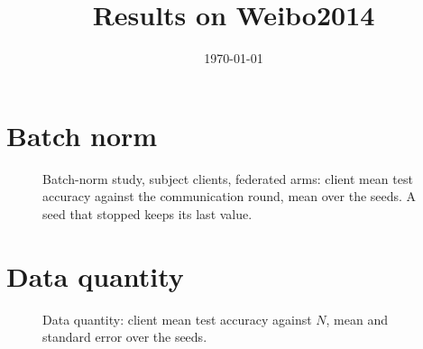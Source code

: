 \documentclass[a4paper]{article}
\title{Results on Weibo2014}
\date{\today}
\begin{document}
\maketitle
\section{Batch norm}
\begin{table}[htbp]\centering
\caption{Batch-norm study: client mean test accuracy (\%), mean $\pm$ std over the seeds. Best mean of each row and network in bold.}
\resizebox{\ifdim\width>\linewidth\linewidth\else\width\fi}{!}{}
\end{table}
\begin{table}[htbp]\centering
\caption{Batch-norm study, SPDNet, subject clients: test accuracy of each subject (\%). Best mean of each row in bold.}
\resizebox{\ifdim\width>\linewidth\linewidth\else\width\fi}{!}{}
\end{table}
\begin{figure}[htbp]\centering

\caption{Batch-norm study, subject clients, federated arms: client mean test accuracy against the communication round, mean over the seeds. A seed that stopped keeps its last value.}
\end{figure}
\clearpage
\section{Data quantity}
\begin{table}[htbp]\centering
\caption{Data quantity (every subject has $N$ trials per class): client mean test accuracy (\%). Best mean of each column and block in bold.}
\resizebox{\ifdim\width>\linewidth\linewidth\else\width\fi}{!}{}
\end{table}
\begin{figure}[htbp]\centering

\caption{Data quantity: client mean test accuracy against $N$, mean and standard error over the seeds.}
\end{figure}
\clearpage
\end{document}

